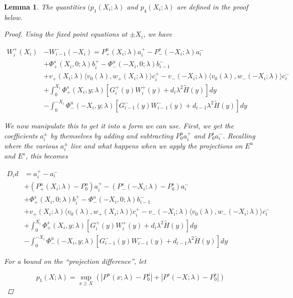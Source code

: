 \documentclass[12pt]{article}
\newtheorem{lemma}{Lemma}
\begin{document}
\begin{lemma}
The quantities $(p_1(X_i; \lambda)$ and $p_4(X_i; \lambda)$ are defined in the proof below. 

\begin{proof}

Using the fixed point equations at $\pm X_i$, we have

\begin{align*}
W_i^+(X_i) &- W_{i-1}^-(-X_i) = P^u_+(X_i; \lambda) a_i^+ - P^s_-(-X_i; \lambda) a_i^- \\
&+ \Phi^s_+(X_i, 0; \lambda)b_i^+ - \Phi^u_-(-X_i, 0; \lambda)b_{i-1}^- \\
&+ v_+(X_i; \lambda) \langle v_0(\lambda), w_+(X_i; \lambda) \rangle c_i^+ - v_-(-X_i; \lambda) \langle v_0(\lambda), w_-(-X_i; \lambda) \rangle c_i^- \\
&+ \int_0^{X_i} \Phi^s_+(X_i, y; \lambda) [ G_i^+(y) W_i^+(y) + d_i \lambda^2 \tilde{H}(y) ] dy \\
&- \int_0^{-X_i} \Phi^u_-(-X_i, y; \lambda) [ G_{i-1}^-(y) W_{i-1}^-(y) + d_{i-1} \lambda^2 \tilde{H}(y) ] dy
\end{align*}

We now manipulate this to get it into a form we can use. First, we get the coefficients $a_i^\pm$ by themselves by adding and subtracting $P_0^u a_i^+$ and $P_0^s a_i^-$. Recalling where the various $a_i^\pm$ live and what happens when we apply the projections on $E^u$ and $E^s$, this becomes

\begin{align*}
D_i d &= a_i^+ - a_i^- \\
&+ (P^u_+(X_i; \lambda) - P_0^u)a_i^+ - (P^s_-(-X_i; \lambda) - P_0^s)a_i^- \\
&+ \Phi^s_+(X_i, 0; \lambda)b_i^+ - \Phi^u_-(-X_i, 0; \lambda)b_{i-1}^- \\
&+ v_+(X_i; \lambda) \langle v_0(\lambda), w_+(X_i; \lambda) \rangle c_i^+ - v_-(-X_i; \lambda) \langle v_0(\lambda), w_-(-X_i; \lambda) \rangle c_i^- \\
&+ \int_0^{X_i} \Phi^s_+(X_i, y; \lambda) [ G_i^+(y) W_i^+(y) + d_i \lambda^2 \tilde{H}(y) ] dy \\
&- \int_0^{-X_i} \Phi^u_-(-X_i, y; \lambda) [ G_{i-1}^-(y) W_{i-1}^-(y) + d_{i-1} \lambda^2 \tilde{H}(y) ] dy
\end{align*}

For a bound on the ``projection difference'', let

\[
p_1(X;\lambda) = \sup_{x \geq X} (|P^u(x; \lambda) - P_0^u| + |P^s(-X; \lambda) - P_0^s|)
\]


\end{proof}
\end{lemma}
\end{document}
